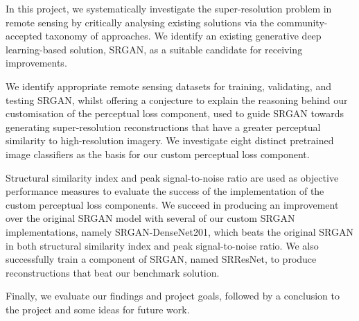 In this project, we systematically investigate the super-resolution problem in remote sensing by critically analysing existing solutions via the community-accepted taxonomy of approaches. We identify an existing generative deep learning-based solution, SRGAN, as a suitable candidate for receiving improvements.

We identify appropriate remote sensing datasets for training, validating, and testing SRGAN, whilst offering a conjecture to explain the reasoning behind our customisation of the perceptual loss component, used to guide SRGAN towards generating super-resolution reconstructions that have a greater perceptual similarity to high-resolution imagery. We investigate eight distinct pretrained image classifiers as the basis for our custom perceptual loss component.

Structural similarity index and peak signal-to-noise ratio are used as objective performance measures to evaluate the success of the implementation of the custom perceptual loss components. We succeed in producing an improvement over the original SRGAN model with several of our custom SRGAN implementations, namely SRGAN-DenseNet201, which beats the original SRGAN in both structural similarity index and peak signal-to-noise ratio. We also successfully train a component of SRGAN, named SRResNet, to produce reconstructions that beat our benchmark solution.

Finally, we evaluate our findings and project goals, followed by a conclusion to the project and some ideas for future work.

